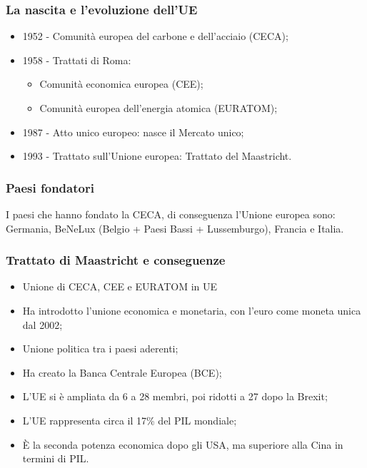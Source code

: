 \documentclass{article}
\begin{document}
\subsubsection{La nascita e l'evoluzione dell'UE}
\begin{itemize}
    \item 1952 - Comunità europea del carbone e dell'acciaio (CECA);
    \item 1958 - Trattati di Roma:
        \begin{itemize}
            \item Comunità economica europea (CEE);
            \item Comunità europea dell'energia atomica (EURATOM);
        \end{itemize}
    \item 1987 - Atto unico europeo: nasce il Mercato unico;
    \item 1993 - Trattato sull'Unione europea: Trattato del Maastricht.
\end{itemize}

\subsubsection{Paesi fondatori}
I paesi che hanno fondato la CECA, di conseguenza l'Unione europea sono:\\
Germania, BeNeLux (Belgio + Paesi Bassi + Lussemburgo), Francia e Italia.

\subsubsection{Trattato di Maastricht e conseguenze}
\begin{itemize}
    \item Unione di CECA, CEE e EURATOM in UE
    \item Ha introdotto l'unione economica e monetaria, con l'euro come moneta unica dal 2002;
    \item Unione politica tra i paesi aderenti;
    \item Ha creato la Banca Centrale Europea (BCE);
    \item L'UE si è ampliata da 6 a 28 membri, poi ridotti a 27 dopo la Brexit;
    \item L'UE rappresenta circa il 17\% del PIL mondiale;
    \item È la seconda potenza economica dopo gli USA, ma superiore alla Cina in termini di PIL.
\end{itemize}
\end{document}
